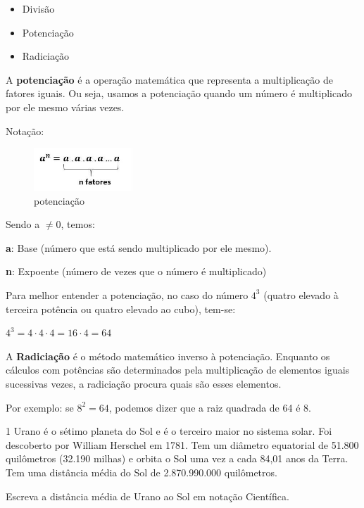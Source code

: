 {\begin{escolha}
{\begin{itemize}
  \item Divisão

  \item Potenciação

  \item Radiciação
\end{itemize}

A \textbf{potenciação} é a operação matemática que representa a
multiplicação de fatores iguais. Ou seja, usamos a potenciação quando um
número é multiplicado por ele mesmo várias vezes.

Notação:

\begin{figure}
\centering
\includegraphics[width=1.46875in,height=0.63399in]{./_SAEB_9_MAT/media/image32.jpeg}
\caption{potenciação}
\end{figure}

Sendo a $\neq 0$, temos:

\textbf{a}: Base (número que está sendo multiplicado por ele mesmo).

\textbf{n}: Expoente (número de vezes que o número é multiplicado)

Para melhor entender a potenciação, no caso do número
$4^3$ (quatro elevado à terceira potência ou quatro
elevado ao cubo), tem-se:

$4^3 = 4 \cdot 4 \cdot 4 = 16 \cdot 4 = 64$

A \textbf{Radiciação} é o método matemático inverso à potenciação. Enquanto os
cálculos com potências são determinados pela multiplicação de elementos
iguais sucessivas vezes, a radiciação procura quais são esses elementos.

Por exemplo: se $8^2 = 64$, podemos dizer que a raiz quadrada de
64 é 8.


\num{1} Urano é o sétimo planeta do Sol e é o terceiro maior no sistema
solar. Foi descoberto por William Herschel em 1781. Tem um diâmetro
equatorial de 51.800 quilômetros (32.190 milhas) e orbita o Sol uma vez
a cada 84,01 anos da Terra. Tem uma distância média do Sol de
2.870.990.000 quilômetros.

Escreva a distância média de Urano ao Sol em notação Científica.


}
\end{escolha}}
